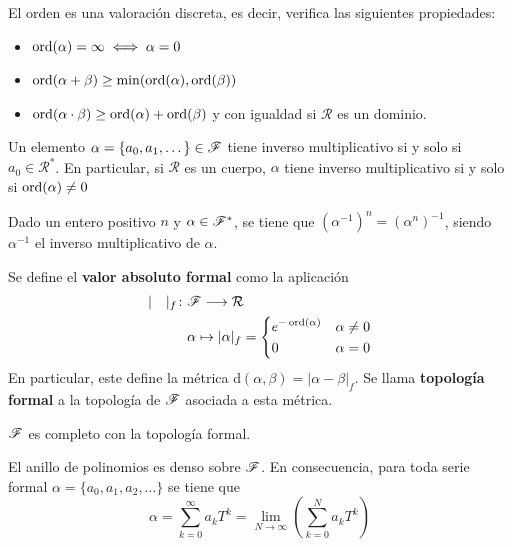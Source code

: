 \begin{proposicion} El orden es una valoración discreta, es decir, verifica las siguientes propiedades:
    \begin{itemize}
        \item $\operatorname*{ord}(\alpha) = \infty \iff \alpha = 0$
        \item $\operatorname*{ord}(\alpha + \beta) \geq \min(\operatorname*{ord}(\alpha), \operatorname*{ord}(\beta))$
        \item $\operatorname*{ord}(\alpha \cdot \beta) \geq \operatorname*{ord}(\alpha) + \operatorname*{ord}(\beta)$ y con igualdad si $\mathcal{R}$ es un dominio.
    \end{itemize}
\end{proposicion}

\begin{teorema}
    Un elemento $\alpha = \{a_0, a_1, \dots\} \in \mathscr{F}$ tiene inverso multiplicativo si y solo si $a_0 \in \mathcal{R}^*$. En particular, si $\mathcal{R}$ es un cuerpo, $\alpha$ tiene inverso multiplicativo si y solo si $\operatorname*{ord}(\alpha) \neq 0$ 
\end{teorema}

\begin{proposicion}
    Dado un entero positivo $n$ y $\alpha \in \mathscr{F}^*$, se tiene que $(\alpha^{-1})^n = (\alpha^n)^{-1}$, siendo $\alpha^{-1}$ el inverso multiplicativo de $\alpha$.
\end{proposicion}

\begin{definicion}
    Se define el \textbf{valor absoluto formal} como la aplicación
    \begin{align*}
        | \quad |_f \colon & \mathscr{F} \longrightarrow \mathcal{R} \\
        & \alpha \mapsto |\alpha|_f = \begin{dcases}
            e^{-\operatorname*{ord}(\alpha)} & \alpha \neq 0\\
            0 & \alpha = 0
        \end{dcases}
    \end{align*}
    En particular, este define la métrica $\text{d}(\alpha, \beta) = |\alpha - \beta|_f$. Se llama \textbf{topología formal} a la topología de $\mathscr{F}$ asociada a esta métrica.
\end{definicion}

\begin{teorema}
    $\mathscr{F}$ es completo con la topología formal.
\end{teorema}

\begin{teorema}
    El anillo de polinomios es denso sobre $\mathscr{F}$. En consecuencia, para toda serie formal $\alpha = \{ a_0, a_1, a_2,\dots\}$ se tiene que
    \begin{equation*}
        \alpha = \sum_{k=0}^{\infty} a_k T^k = \lim_{N \longrightarrow \infty} \left(\sum_{k=0}^{N} a_k T^k\right)
    \end{equation*}
\end{teorema}


